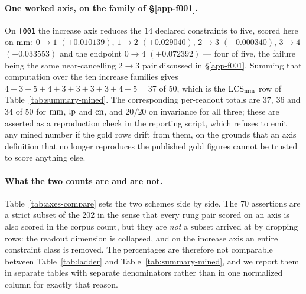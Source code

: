 \paragraph{One worked axis, on the family of \S\ref{app-f001}.} On \texttt{f001} the increase axis
reduces the $14$ declared constraints to five, scored here on $\mathrm{mm}$:
$0\!\to\!1$ $(+0.010139)$, $1\!\to\!2$ $(+0.029040)$, $2\!\to\!3$ $(-0.000340)$,
$3\!\to\!4$ $(+0.033553)$ and the endpoint $0\!\to\!4$ $(+0.072392)$ --- four of five, the failure being
the same near-cancelling $2\!\to\!3$ pair discussed in \S\ref{app-f001}. Summing that computation over
the ten increase families gives $4+3+5+4+3+3+3+3+4+5 = 37$ of $50$, which is the $\mathrm{LCS}_{\mathrm{mm}}$ row of
Table~\ref{tab:summary-mined}. The corresponding per-readout totals are $37$, $36$ and $34$ of $50$ for
$\mathrm{mm}$, $\mathrm{lp}$ and $\mathrm{cn}$, and $20/20$ on invariance for all three; these are asserted as a
reproduction check in the reporting script, which refuses to emit any mined number if the gold rows
drift from them, on the grounds that an axis definition that no longer reproduces the published gold
figures cannot be trusted to score anything else.

\paragraph{What the two counts are and are not.} Table~\ref{tab:axes-compare} sets the two schemes side
by side. The $70$ assertions are a strict subset of the $202$ in the sense that every rung pair scored
on an axis is also scored in the corpus count, but they are \emph{not} a subset arrived at by dropping
rows: the readout dimension is collapsed, and on the increase axis an entire constraint class is
removed. The percentages are therefore not comparable between Table~\ref{tab:ladder} and
Table~\ref{tab:summary-mined}, and we report them in separate tables with separate denominators rather than
in one normalized column for exactly that reason.

